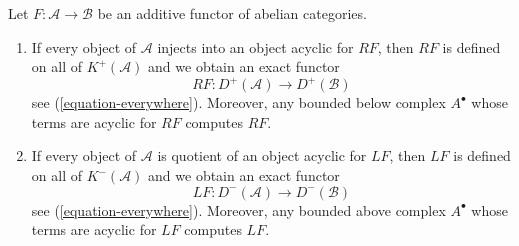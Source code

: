 \begin{proposition}
\label{proposition-enough-acyclics}
Let $F : \mathcal{A} \to \mathcal{B}$ be an additive functor of
abelian categories.
\begin{enumerate}
\item If every object of $\mathcal{A}$ injects into an object acyclic
for $RF$, then $RF$ is defined on all of $K^{+}(\mathcal{A})$
and we obtain an exact functor
$$
RF : D^{+}(\mathcal{A}) \longrightarrow D^{+}(\mathcal{B})
$$
see (\ref{equation-everywhere}). Moreover, any bounded below complex
$A^\bullet$ whose terms are acyclic for $RF$ computes $RF$.
\item If every object of $\mathcal{A}$ is quotient of
an object acyclic for $LF$, then $LF$ is defined on all of
$K^{-}(\mathcal{A})$ and we obtain an exact functor
$$
LF : D^{-}(\mathcal{A}) \longrightarrow D^{-}(\mathcal{B})
$$
see (\ref{equation-everywhere}). Moreover, any bounded above complex
$A^\bullet$ whose terms are acyclic for $LF$ computes $LF$.
\end{enumerate}
\end{proposition}

